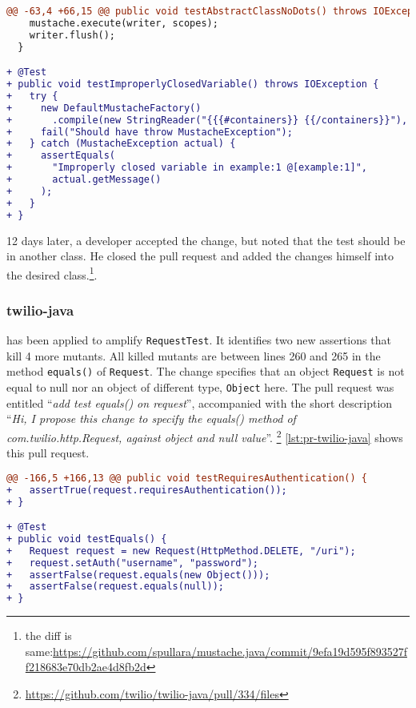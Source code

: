 \begin{lstlisting}[language=diff,caption=Test-improvement proposed to mustache.java developers.,label=lst:pr-mustache.java]
@@ -63,4 +66,15 @@ public void testAbstractClassNoDots() throws IOException {
    mustache.execute(writer, scopes);
    writer.flush();
  }

+ @Test
+ public void testImproperlyClosedVariable() throws IOException {
+   try {
+     new DefaultMustacheFactory()
+       .compile(new StringReader("{{{#containers}} {{/containers}}"), "example");
+     fail("Should have throw MustacheException");
+   } catch (MustacheException actual) {
+     assertEquals(
+       "Improperly closed variable in example:1 @[example:1]",
+       actual.getMessage()
+     );
+   }
+ }
\end{lstlisting}

12 days later, a developer accepted the change, but noted that the test should be in another class.
He closed the pull request and added the changes himself into the desired class.\footnote{the diff is same:\url{https://github.com/spullara/mustache.java/commit/9efa19d595f893527ff218683e70db2ae4d8fb2d}}. 

\subsubsection{twilio-java}

\dspot has been applied to amplify \texttt{RequestTest}. 
It identifies two new assertions that kill 4 more mutants. 
All killed mutants are between lines 260 and 265 in the method \texttt{equals()} of \texttt{Request}. 
The change specifies that an object \texttt{Request} is not equal to null nor an object of different type, \ie \texttt{Object} here. 
The pull request was entitled ``\emph{add test equals() on request}'', accompanied with the short description ``\emph{Hi, I propose this change to specify the equals() method of com.twilio.http.Request, against object and null value}''. \footnote{\url{https://github.com/twilio/twilio-java/pull/334/files}}
\autoref{lst:pr-twilio-java} shows this pull request.

\begin{lstlisting}[float,language=diff,caption=Test-improvement proposed to twilio-java developers.,label=lst:pr-twilio-java]
@@ -166,5 +166,13 @@ public void testRequiresAuthentication() {
+   assertTrue(request.requiresAuthentication());
+ }

+ @Test
+ public void testEquals() {
+   Request request = new Request(HttpMethod.DELETE, "/uri");
+   request.setAuth("username", "password");
+   assertFalse(request.equals(new Object()));
+   assertFalse(request.equals(null));
+ }
\end{lstlisting}

